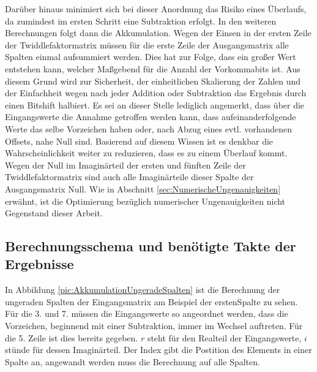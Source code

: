  Darüber hinaus minimiert sich bei dieser Anordnung das Risiko eines Überlaufs, da zumindest im ersten Schritt eine Subtraktion erfolgt. In den weiteren Berechnungen folgt dann die Akkumulation. 
 Wegen der Einsen in der ersten Zeile der Twiddlefaktormatrix müssen für die erste Zeile der Ausgangsmatrix alle Spalten einmal aufsummiert werden.
 Dies hat zur Folge, dass ein großer Wert entstehen kann, welcher Maßgebend für die Anzahl der Vorkommabits ist.
 Aus diesem Grund wird zur Sicherheit, der einheitlichen Skalierung der Zahlen und der Einfachheit wegen nach jeder Addition oder Subtraktion das Ergebnis durch einen Bitshift halbiert. 
 Es sei an dieser Stelle lediglich angemerkt, dass über die Eingangswerte die Annahme getroffen werden kann, dass aufeinanderfolgende Werte das selbe Vorzeichen haben oder, nach Abzug eines evtl. vorhandenen Offsets, nahe Null sind. 
 Basierend auf diesem Wissen ist es denkbar die Wahrscheinlichkeit weiter zu reduzieren, dass es zu einem Überlauf kommt. 
Wegen der Null im Imaginärteil der ersten und fünften Zeile der Twiddlefaktormatrix sind auch alle Imaginärteile dieser Spalte der Ausgangsmatrix Null.
Wie in Abschnitt \ref{sec:NumerischeUngenauigkeiten} erwähnt, ist die Optimierung bezüglich numerischer Ungenauigkeiten nicht Gegenstand dieser Arbeit.

 
 
\subsection{Berechnungsschema und benötigte Takte der Ergebnisse}\label{sec:Berechnungsschema}

In Abbildung \ref{pic:AkkumulationUngeradeSpalten} ist die Berechnung der ungeraden Spalten der Eingangsmatrix am Beispiel der erstenSpalte zu sehen. Für die 3. und 7. müssen die 
Eingangswerte so angeordnet werden, dass die Vorzeichen, beginnend mit einer Subtraktion, immer im Wechsel auftreten. Für die 5. Zeile ist dies bereits gegeben.
$r$ steht für den Realteil der Eingangswerte, $i$ stünde für dessen Imaginärteil. Der Index gibt die Postition des Elements in einer Spalte an, angewandt werden muss die
Berechnung auf alle Spalten.


